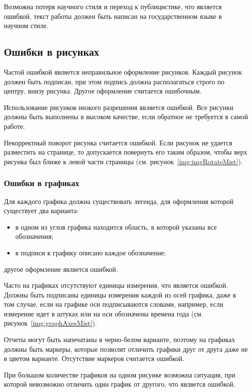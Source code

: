\begin{appendices}
	Возможна потеря научного стиля и переход к публицистике, что является ошибкой, текст работы должен быть написан на государственном языке в научном стиле.
	
	\subsection{Ошибки в рисунках}
	Частой ошибкой является неправильное оформление рисунков. Каждый рисунок должен быть подписан, при этом подпись должна располагаться строго по центру, внизу рисунка. Другое оформление считается ошибочным.
	
	Использование рисунков низкого разрешения является ошибкой. Все рисунки должны быть выполнены в высоком качестве, если обратное не требуется в самой работе.
	
	Некорректный поворот рисунка считается ошибкой. Если рисунок не удается разместить на странице, то допускается повернуть его таким образом, чтобы верх рисунка был ближе к левой части страницы (см. рисунок~\ref{img:imgRotateMist}).
	
	\subsubsection{Ошибки в графиках}
	Для каждого графика должна существовать легенда, для оформления которой существует два варианта:
	\begin{itemize}
		\item в одном из углов графика находится область, в которой указаны все обозначения;
		\item в подписи к графику описано каждое обозначение;
	\end{itemize}
	другое оформление является ошибкой.
	
	Часто на графиках отсутствуют единицы измерения, что является ошибкой. Должны быть подписаны единицы измерения каждой из осей графика, даже в том случае, если на графике оси подписываются словами, например, если измерение идет в штуках или на оси обозначены времена года (см. рисунок~\ref{img:graphAxesMist}).
	
	Отчеты могут быть напечатаны в черно-белом варианте, поэтому на графиках должны быть маркеры, которые позволят отличить графики друг от друга даже не в цветом варианте. Отсутствие маркеров считается ошибкой.
	
	При большом количестве графиков на одном рисунке возможна ситуация, при которой невозможно отличить один график от другого, что является ошибкой.
	

\end{appendices}

